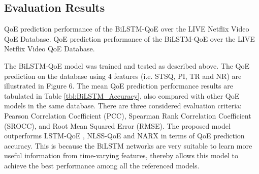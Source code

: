 \subsection{Evaluation Results}


  {QoE prediction performance of the BiLSTM-QoE over the LIVE Netflix Video QoE Database.\label{fig:BiLSTM_Accuracy}}
  {QoE prediction performance of the BiLSTM-QoE over the LIVE Netflix Video QoE Database.\label{tbl:BiLSTM_Accuracy}}


The BiLSTM-QoE model was trained and tested as described above.
The QoE prediction on the database using 4 features (i.e. STSQ, PI, TR and NR) are illustrated in Figure 6. 
The mean QoE prediction performance results are tabulated in Table \ref{tbl:BiLSTM_Accuracy},
also compared with other QoE models in the same database.
There are three considered evaluation criteria: Pearson Correlation Coefficient (PCC), Spearman Rank Correlation Coefficient (SROCC), and Root Mean Squared Error (RMSE).
The proposed model outperforms LSTM-QoE \citep{QoEModel_LSTM}, NLSS-QoE \citep{QoEModel_NLSS} and NARX \citep{QoEModel_NARX_DynamicNetworks} in terms of QoE prediction accuracy.
This is because the BiLSTM networks are very suitable to learn more useful information from time-varying features,
thereby allows this model to achieve the best performance among all the referenced models.